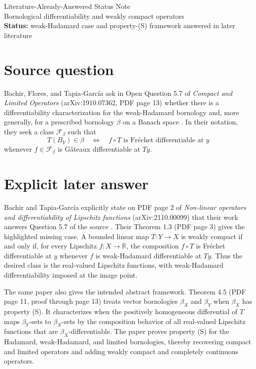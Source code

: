 \documentclass[10pt]{article}
\begin{document}
\begin{center}
{\Large Literature-Already-Answered Status Note}\\[0.3em]
{\large Bornological differentiability and weakly compact operators}\\[0.4em]
\textbf{Status:} weak-Hadamard case and property-(S) framework answered in later literature
\end{center}

\section*{Source question}

Bachir, Flores, and Tapia-Garc\'ia ask in Open Question 5.7 of
\emph{Compact and Limited Operators} (arXiv:1910.07362, PDF page 13) whether
there is a differentiability characterization for the weak-Hadamard bornology
and, more generally, for a prescribed bornology $\beta$ on a Banach space
\cite{source}. In their notation, they seek a class $\mathcal F_\beta$ such
that
\[
 T(B_Y)\in\beta
 \quad\Longleftrightarrow\quad
 f\circ T\text{ is Fr\'echet differentiable at }y
\]
whenever $f\in\mathcal F_\beta$ is G\^ateaux differentiable at $Ty$.

\section*{Explicit later answer}

Bachir and Tapia-Garc\'ia explicitly state on PDF page 2 of
\emph{Non-linear operators and differentiability of Lipschitz functions}
(arXiv:2110.00099) that their work answers Question 5.7 of the source
\cite{answer}. Their Theorem 1.3 (PDF page 3) gives the highlighted missing
case. A bounded linear map $T:Y\to X$ is weakly compact if and only if, for
every Lipschitz $f:X\to\mathbb R$, the composition $f\circ T$ is Fr\'echet
differentiable at $y$ whenever $f$ is weak-Hadamard differentiable at $Ty$.
Thus the desired class is the real-valued Lipschitz functions, with
weak-Hadamard differentiability imposed at the image point.

The same paper also gives the intended abstract framework. Theorem 4.5
(PDF page 11, proof through page 13) treats vector bornologies $\beta_X$ and
$\beta_Y$ when $\beta_X$ has property (S). It characterizes when the
positively homogeneous differential of $T$ maps $\beta_Y$-sets to
$\beta_X$-sets by the composition behavior of all real-valued Lipschitz
functions that are $\beta_X$-differentiable. The paper proves property (S)
for the Hadamard, weak-Hadamard, and limited bornologies, thereby recovering
compact and limited operators and adding weakly compact and completely
continuous operators.
\end{document}
